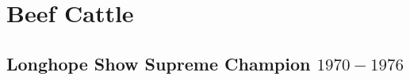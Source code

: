 \chapter{Beef Cattle}
\section[Supreme Champion]{Longhope Show Supreme Champion $1970 - 1976$}
\small

\normalsize

